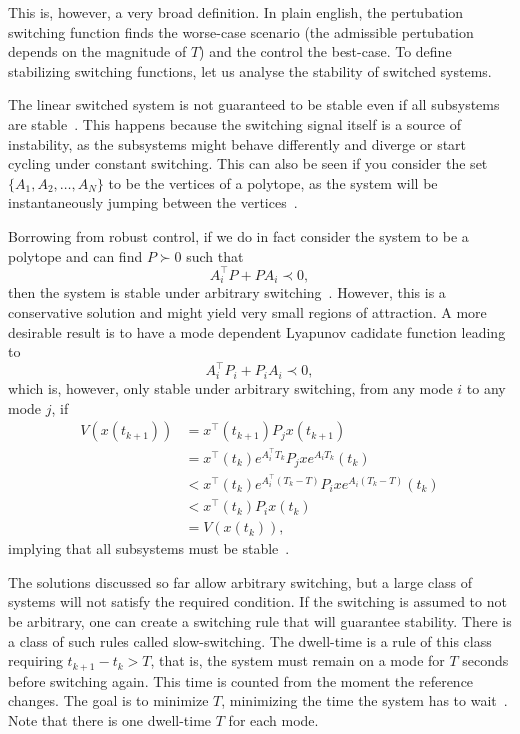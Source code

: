 This is, however, a very broad definition. In plain english, the pertubation
switching function finds the worse-case scenario (the admissible pertubation
depends on the magnitude of \(T\)) and the control the best-case. To define
stabilizing switching functions, let us analyse the stability of switched
systems.

The linear switched system is not guaranteed to be stable even if all subsystems
are stable~\parencite{liberzon.morse:basic}. This happens because the switching
signal itself is a source of instability, as the subsystems might behave
differently and diverge or start cycling under constant switching. This can also
be seen if you consider the set \(\{A_{1}, A_{2}, \ldots, A_{N}\}\) to be the
vertices of a polytope, as the system will be instantaneously jumping between
the vertices~\parencite{geromel.colaneri:stabilization}.

Borrowing from robust control, if we do in fact consider the system to be a
polytope and can find \(P\succ{}0\) such that
%
\begin{equation}
  A_{i}^{\top}P+PA_{i} \prec{} 0,
\end{equation}
%
then the system is stable under arbitrary
switching~\parencite{geromel.deaecto:stability}. However, this is a conservative
solution and might yield very small regions of attraction. A more desirable
result is to have a mode dependent Lyapunov cadidate function leading to
%
\begin{equation}
  A_{i}^{\top}P_{i}+P_{i}A_{i} \prec{} 0,
\end{equation}
%
which is, however, only stable under arbitrary switching, from any mode \(i\) to
any mode \(j\), if
%
\begin{align}
  V(x(t_{k+1})) & = x^{\top}(t_{k+1})P_{j}x(t_{k+1})                                        \\
                & = x^{\top}(t_{k})e^{A^{\top}_{i}T_{k}}P_{j}xe^{A_{i}T_{k}}(t_{k})         \\
                & < x^{\top}(t_{k})e^{A^{\top}_{i}(T_{k}-T)}P_{i}xe^{A_{i}(T_{k}-T)}(t_{k}) \\
                & < x^{\top}(t_{k})P_{i}x(t_{k})                                            \\
                & = V(x(t_{k})),
\end{align}
%
implying that all subsystems must be
stable~\parencite{geromel.colaneri:stabilization}.

The solutions discussed so far allow arbitrary switching, but a large class of
systems will not satisfy the required condition. If the switching is assumed to
not be arbitrary, one can create a switching rule that will guarantee stability.
There is a class of such rules called slow-switching. The dwell-time is a rule
of this class requiring \(t_{k+1}-t_{k}>T\), that is, the system must remain on
a mode for \(T\) seconds before switching again. This time is counted from the
moment the reference changes. The goal is to minimize \(T\), minimizing the time
the system has to
wait~\parencite{chesi.colaneri.ea:computing,franzè.lucia.ea:command,liberzon.morse:basic}.
Note that there is one dwell-time \(T\) for each mode.

